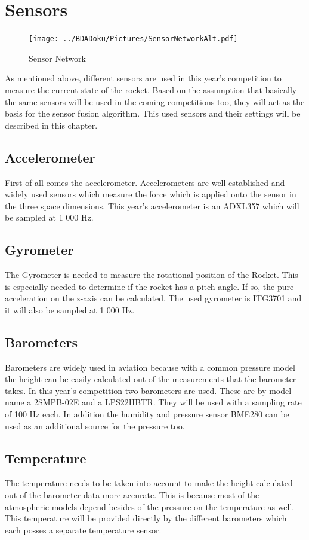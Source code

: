  \section{Sensors}
 \begin{figure}[h!]
  \centering
  \texttt{[image: ../BDADoku/Pictures/SensorNetworkAlt.pdf]}
  \caption{Sensor Network}
  \label{fig:SensorNetwork}
 \end{figure}

 As mentioned above, different sensors are used in this year's competition to measure the current state of the rocket. Based on the assumption
 that basically the same sensors will be used in the coming competitions too, they will act as the basis for the sensor fusion algorithm.
 This used sensors and their settings will be described in this chapter.

 \subsection{Accelerometer}
 First of all comes the accelerometer. Accelerometers are well established and widely used sensors which measure the force which is applied onto the sensor in the three space dimensions.
 This year's accelerometer is an ADXL357 which will be sampled at 1 000 Hz.

 \subsection{Gyrometer}
 The Gyrometer is needed to measure the rotational position of the Rocket. This is especially needed to determine if the rocket has a pitch angle. If so, the pure  acceleration on the z-axis can be calculated. The used gyrometer is ITG3701 and it will also be sampled at 1 000 Hz.

 \subsection{Barometers}
 Barometers are widely used in aviation because with a common pressure model the height can be easily calculated out of the measurements that the barometer takes.
 In this year's competition two barometers are used. These are by model name a 2SMPB-02E and a LPS22HBTR. They will be used with a sampling rate of 100 Hz each.
 In addition the humidity and pressure sensor BME280 can be used as an additional source for the pressure too.

 \subsection{Temperature}
 The temperature needs to be taken into account to make the height calculated out of the barometer data more accurate. This is because most of the atmospheric models depend besides of the pressure on the temperature as well.
 This temperature will be provided directly by the different barometers which each posses a separate temperature sensor.

